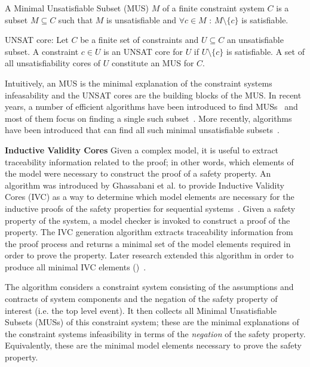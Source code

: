 \begin{definition} A Minimal Unsatisfiable Subset (MUS) $M$ of a finite constraint system $C$ is a subset $M \subseteq C$ such that $M$ is unsatisfiable and $\forall c \in M$ : $M \setminus \{c\}$ is satisfiable. 
\end{definition}

\begin{definition} UNSAT core: Let $C$ be a finite set of constraints and $U \subseteq C$ an unsatisfiable subset. A constraint $c \in U$ is an UNSAT core for $U$ if $U \setminus \{c\}$ is satisfiable. A set of all unsatisfiability cores of $U$ constitute an MUS for $C$. 
\end{definition}

Intuitively, an MUS is the minimal explanation of the constraint systems infeasability and the UNSAT cores are the building blocks of the MUS. In recent years, a number of efficient algorithms have been introduced to find MUSs~\cite{liffiton2005max} and most of them focus on finding a single such subset~\cite{belov2012towards, belov2013core, belov2012muser2}. More recently, algorithms have been introduced that can find all such minimal unsatisfiable subsets~\cite{GhassabaniGW16, Ghassabani2017EfficientGO,bendik2018online}. 


\textbf{Inductive Validity Cores} Given a complex model, it is useful to extract traceability information related to the proof; in other words, which elements of the model were necessary to construct the proof of a safety property. An algorithm was introduced by Ghassabani et al. to provide Inductive Validity Cores (IVC) as a way to determine which model elements are necessary for the inductive proofs of the safety properties for sequential systems~\cite{GhassabaniGW16}. Given a safety property of the system, a model checker is invoked to construct a proof of the property. The IVC generation algorithm extracts traceability information from the proof process and returns a minimal set of the model elements required in order to prove the property. Later research extended this algorithm in order to produce all minimal IVC elements (\aivcalg)~\cite{Ghassabani2017EfficientGO,bendik2018online}. 

The \aivcalg algorithm considers a constraint system consisting of the assumptions and contracts of system components and the negation of the safety property of interest (i.e. the top level event). It then collects all Minimal Unsatisfiable Subsets (MUSs) of this constraint system; these are the minimal explanations of the constraint systems infeasibility in terms of the \textit{negation} of the safety property. Equivalently, these are the minimal model elements necessary to prove the safety property. 

 
